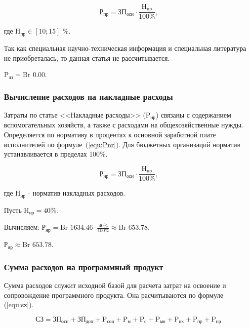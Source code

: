 \begin{equation}
    \label{equ:Pnk}
    \text{Р}_\text{пр} = \text{ЗП}_\text{осн} \cdot \frac{ \text{Н}_\text{пр} }{ 100\% } \text{,}
\end{equation}

где $\text{Н}_\text{пр} \in [10; 15]$ \%.

Так как специальная научно-техническая информация и специальная литература не приобреталась, то данная статья не рассчитывается.

$\text{P}_\text{пз} = \text{Br }0.00$.

\subsubsection*{Вычисление расходов на накладные расходы}

Затраты по статье <<Накладные расходы>> ($\text{P}_\text{нр}$)
связаны с содержанием вспомогательных хозяйств,
а также с расходами на общехозяйственные нужды.
Определяется по нормативу в процентах к основной заработной плате исполнителей по формуле~(\ref{equ:Pnr}).
Для бюджетных организаций норматив устанавливается в пределах 100\%.

\begin{equation}
    \label{equ:Pnr}
    \text{Р}_\text{нр} = \text{ЗП}_\text{осн} \cdot  \frac{ \text{Н}_\text{нр} }{ 100\% } \text{,}
\end{equation}

где $\text{Н}_\text{нр}$ - норматив накладных расходов.

Пусть $\text{Н}_\text{нр} = 40\%$.

Вычисляем: $\text{Р}_\text{нр} = \text{Br } 1634.46 \cdot \frac{ 40\% }{ 100\% } \approx \text{Br }653.78$.

$\text{Р}_\text{нр} \approx \text{Br }653.78$.

\subsubsection*{Сумма расходов на программный продукт}

Сумма расходов служит исходной базой для расчета затрат на освоение и сопровождение программного продукта.
Она расчитываются по формуле (\ref{equ:sz}).

\begin{equation}
    \label{equ:sz}
    \text{СЗ} =
    \text{ЗП}_\text{осн}
    + \text{ЗП}_\text{доп}
    + \text{P}_\text{соц}
    + \text{P}_\text{м}
    + \text{P}_\text{с}
    + \text{P}_\text{мв}
    + \text{P}_\text{нк}
    + \text{P}_\text{пр}
    + \text{P}_\text{нр}
\end{equation}

